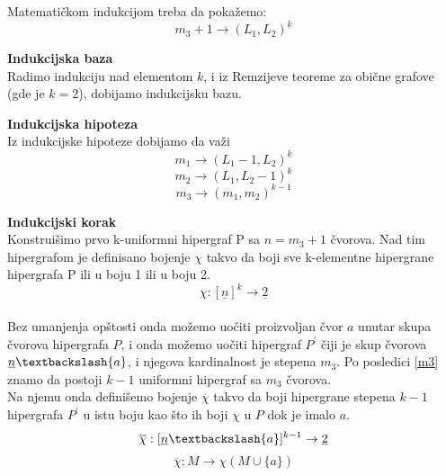 \documentclass[a4paper]{article}
\begin{document}
	\noindent  
	Matematičkom indukcijom treba da pokažemo:
	\begin{equation}\label{OsnovnaRemzijeva}
		m_{3} + 1 \rightarrow (L_1, L_2)^k		
	\end{equation}
	\begin{description}
		\item \textbf{Indukcijska baza} \\
		Radimo indukciju nad elementom $k$, i iz Remzijeve teoreme za obične grafove (gde je $k = 2$), dobijamo indukcijsku bazu. 
		\item \textbf{Indukcijska hipoteza}\\
		Iz indukcijske hipoteze dobijamo da važi
		\begin{equation}\label{m1}
		m_{1} \rightarrow (L_1 - 1, L_2)^k		
		\end{equation}
		\begin{equation}\label{m2}
		m_{2} \rightarrow (L_1, L_2 -1)^k		
		\end{equation}
		\begin{equation}\label{m3}
		m_{3} \rightarrow (m_1, m_2)^{k-1}		
		\end{equation}
		\item \textbf{Indukcijski korak}\\	
		Konstruišimo prvo k-uniformni hipergraf P sa $n = m_3 + 1$ čvorova. Nad tim hipergrafom je definisano bojenje $\chi$ takvo da boji sve k-elementne hipergrane hipergrafa P ili u boju 1 ili u boju 2.\begin{equation}
			\chi : [ \underline{n} ]^k  \rightarrow \underline{2}
		\end{equation} \\
		Bez umanjenja opštosti onda možemo uočiti proizvoljan čvor $a$ unutar skupa čvorova hipergrafa $P$, i onda možemo uočiti hipergraf $P^\prime$ čiji je skup čvorova $\underline{n} \textbackslash \{ a \}$, i njegova kardinalnost je stepena $m_3$. Po posledici \ref{m3} znamo da postoji $k-1$ uniformni hipergraf sa $m_3$ čvorova. %
		\\
		Na njemu onda definišemo bojenje $\overline{\chi}$ takvo da boji hipergrane stepena $k-1$ hipergrafa $P^\prime $ u istu boju kao što ih boji  $\chi$ u $P$ dok je imalo $a$.
		\begin{equation}
			\overline{\chi} : [ \underline{n} \textbackslash \{a\} ]^{k-1}  \rightarrow \underline{2}
		\end{equation} %
		\begin{equation}
			\overline{\chi}:M \rightarrow \chi (M \cup \{a\})

\end{equation}
\end{description}
\end{document}
